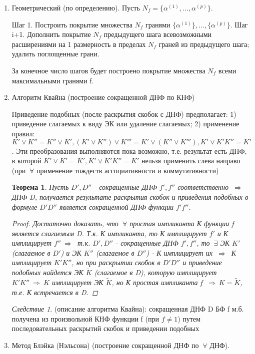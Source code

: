 \documentclass[draft]{report}
\newtheorem*  {theor}  {Теорема}
\theoremstyle {remark}
\theoremstyle {remark}
\newtheorem*  {sled}   {Следствие}
\begin{document}
\begin{enumerate}
\item Геометрический (по определению).
Пусть $N_f=\{\alpha^{(1)},...,\alpha^{(p)}\}$.

Шаг 1. Построить покрытие множества $N_f$ гранями $\{\alpha^{(1)}\},...,\{\alpha^{(p)}\}.$
Шаг i+1. Дополнить покрытие $N_f$ предыдущего шага всевозможными расширениями на 1 размерность в пределах $N_f$ граней из предыдущего шага; удалить поглощенные грани.

За конечное число шагов будет построено покрытие множества $N_f$ всеми максимальными гранями f. 
\item Алгоритм Квайна (построение сокращенной ДНФ по КНФ)

Приведение подобных (после раскрытия скобок с ДНФ) предполагает: 1) приведение слагаемых к виду ЭК или удаление слагаемых; 2) применение правил: $K' \vee K'' = K'' \vee K', (K' \vee K'')\vee K'''=K'\vee(K'' \vee K'''), K' \vee K'K''=K'$. Эти преобразования выполняются пока возможно, т.е. результат есть ДНФ, в которой $K' \vee K'=K', K' \vee K'K''=K'$ нельзя применить слева направо (при $\ \forall$ применение тождеств ассоциативности и коммутативности) 
\begin{theor} 
Пусть $D', D''$ - сокращенные ДНФ $f', f''$ соответственно $\ \Rightarrow\ $ ДНФ D, получается результате раскрытия скобок и приведения подобных в формуле $D'D''$ является сокращенной ДНФ функции $f'f''$.
\begin{proof}
Достаточно доказать, что $\ \forall$ простая импликанта К функции f является слагаемым D. Т.к. К импликанта, то К имплицирует $f'$ и К имплицирует $f'' \ \Rightarrow\ $ т.к. $D', D''$ - сокращенные ДНФ $f', f''$, то $\ \exists$ ЭК $K'$ (слагаемое в $D'$) и ЭК $K''$ (слагаемое в $D''$) - К имплицирует их $\ \Rightarrow\ $ К имплицирует $K'K''$, но при раскрытии скобок в $D'D''$ и приведение подобных найдется ЭК $\tilde{K}$ (слагаемое в D), которую имплицирует $K'K'' \ \Rightarrow\  K$ имплицирует ЭК $\tilde{K}$, но К простая импликанта f $\ \Rightarrow\  K=\tilde{K}$, т.е. К встречается в D.
\end{proof} 
\end{theor}
\begin{sled}
(описание алгоритма Квайна): сокращенная ДНФ D БФ f м.б. получена из произвольной КНФ функции f (при $f \not= 1$) путем последовательных раскрытий скобок и приведении подобных
\end{sled}
\item Метод Блэйка (Нэльсона) (построение сокращенной ДНФ по $\ \forall$ ДНФ).


\end{enumerate}
\end{document}
